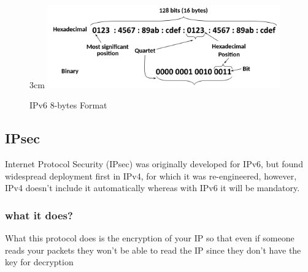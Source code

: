 \documentclass[a4paper,12pt]{book}
\begin{document}
\clearpage

\begin{figure}{3cm}
\centering
\includegraphics[width=10cm]{./IPv6.PNG}
\caption{IPv6 8-bytes Format }\label{wrap-fig:7}
\end{figure}


\subsection{IPsec}
Internet Protocol Security (IPsec) was originally developed for IPv6, but found widespread deployment first in IPv4, for which it was re-engineered, however, IPv4 doesn't include it automatically whereas with IPv6 it will be mandatory.

\subsubsection{what it does?}
What this protocol does is the encryption of your IP so that even if someone reads your packets they won't be able to read the IP since they don't have the key for decryption

%
%
\end{document}
